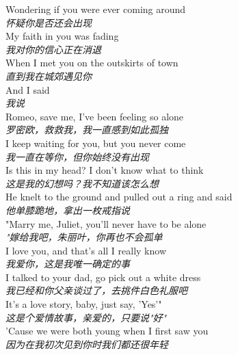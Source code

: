 \begin{spacing}{1.5}
\begin{flushleft}
Wondering if you were ever coming around\\
\textit{怀疑你是否还会出现}\\[0.5em]

My faith in you was fading\\
\textit{我对你的信心正在消退}\\[0.5em]

When I met you on the outskirts of town\\
\textit{直到我在城郊遇见你}\\[0.5em]

And I said\\
\textit{我说}\\[0.5em]

Romeo, save me, I've been feeling so alone\\
\textit{罗密欧，救救我，我一直感到如此孤独}\\[0.5em]

I keep waiting for you, but you never come\\
\textit{我一直在等你，但你始终没有出现}\\[0.5em]

Is this in my head? I don't know what to think\\
\textit{这是我的幻想吗？我不知道该怎么想}\\[0.5em]

He knelt to the ground and pulled out a ring and said\\
\textit{他单膝跪地，拿出一枚戒指说}\\[0.5em]

"Marry me, Juliet, you'll never have to be alone\\
\textit{"嫁给我吧，朱丽叶，你再也不会孤单}\\[0.5em]

I love you, and that's all I really know\\
\textit{我爱你，这是我唯一确定的事}\\[0.5em]

I talked to your dad, go pick out a white dress\\
\textit{我已经和你父亲谈过了，去挑件白色礼服吧}\\[0.5em]

It's a love story, baby, just say, 'Yes'"\\
\textit{这是个爱情故事，亲爱的，只要说"好"}\\[0.5em]

'Cause we were both young when I first saw you\\
\textit{因为在我初次见到你时我们都还很年轻}\\[0.5em]
\end{flushleft}
\end{spacing} 
